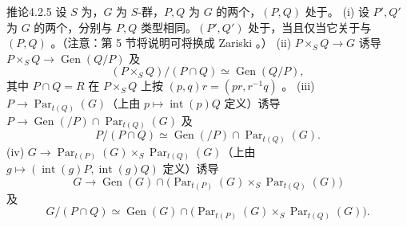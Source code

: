 \begin{SGAresult}{推论}{4.2.5}
设 $S$ 为，$G$ 为 $S$-群，$P,Q$ 为 $G$ 的两个，$(P,Q)$ 处于。
(i) 设 $P',Q'$ 为 $G$ 的两个，分别与 $P,Q$ 类型相同。$(P',Q')$ 处于，当且仅当它关于与 $(P,Q)$ 。（注意：第 5 节将说明可将换成 Zariski 。）
(ii)  $P\times_SQ\to G$ 诱导 $P\times_SQ\to\operatorname{Gen}(Q/P)$ 及
\[(P\times_SQ)/(P\cap Q)\simeq\operatorname{Gen}(Q/P),\]
其中 $P\cap Q=R$ 在 $P\times_SQ$ 上按 $(p,q)r=(pr,r^{-1}q)$ 。
(iii)  $P\to\operatorname{Par}_{t(Q)}(G)$（上由 $p\mapsto\operatorname{int}(p)Q$ 定义）诱导 $P\to\operatorname{Gen}(/P)\cap\operatorname{Par}_{t(Q)}(G)$ 及
\[P/(P\cap Q)\simeq\operatorname{Gen}(/P)\cap\operatorname{Par}_{t(Q)}(G).\]
(iv)  $G\to\operatorname{Par}_{t(P)}(G)\times_S\operatorname{Par}_{t(Q)}(G)$（上由 $g\mapsto(\operatorname{int}(g)P,\operatorname{int}(g)Q)$ 定义）诱导
\[G\longrightarrow\operatorname{Gen}(G)\cap\bigl(\operatorname{Par}_{t(P)}(G)\times_S\operatorname{Par}_{t(Q)}(G)\bigr)\]
及
\[G/(P\cap Q)\simeq\operatorname{Gen}(G)\cap\bigl(\operatorname{Par}_{t(P)}(G)\times_S\operatorname{Par}_{t(Q)}(G)\bigr).\]
\end{SGAresult}
